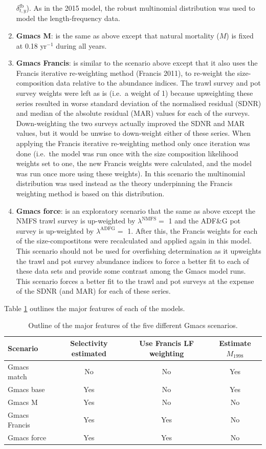 \documentclass[]{article}
\begin{document}
\begin{enumerate}
  \(\delta^\text{fb}_{t,y}\)). As in the 2015 model, the robust
  multinomial distribution was used to model the length-frequency data.
\item
  \textbf{Gmacs M}: is the same as above except that natural mortality
  (\(M\)) is fixed at 0.18 \(\text{yr}^{-1}\) during all years.
\item
  \textbf{Gmacs Francis}: is similar to the scenario above except that
  it also uses the Francis iterative re-weighting method (Francis 2011),
  to re-weight the size-composition data relative to the abundance
  indices. The trawl survey and pot survey weights were left as is
  (i.e.~a weight of 1) because upweighting these series resulted in
  worse standard deviation of the normalised residual (SDNR) and median
  of the absolute residual (MAR) values for each of the surveys.
  Down-weighting the two surveys actually improved the SDNR and MAR
  values, but it would be unwise to down-weight either of these series.
  When applying the Francis iterative re-weighting method only once
  iteration was done (i.e.~the model was run once with the size
  composition likelihood weights set to one, the new Francis weights
  were calculated, and the model was run once more using these weights).
  In this scenario the multinomial distribution was used instead as the
  theory underpinning the Francis weighting method is based on this
  distribution.
\item
  \textbf{Gmacs force}: is an exploratory scenario that the same as
  above except the NMFS trawl survey is up-weighted by
  \(\lambda^\text{NMFS}=\) 1 and the ADF\&G pot survey is up-weighted by
  \(\lambda^\text{ADFG}=\) 1. After this, the Francis weights for each
  of the size-compostitons were recalculated and applied again in this
  model. This scenario should not be used for overfishing determination
  as it upweights the trawl and pot survey abundance indices to force a
  better fit to each of these data sets and provide some contrast among
  the Gmacs model runs. This scenario forces a better fit to the trawl
  and pot surveys at the expense of the SDNR (and MAR) for each of these
  series.
\end{enumerate}

Table \ref{tab:model_runs} outlines the major features of each of the
models.

\begin{table}[ht]
\centering
\caption{Outline of the major features of the five different Gmacs scenarios.} 
\label{tab:model_runs}
\begin{tabular}{lccc}
  \hline
  Scenario & Selectivity estimated & Use Francis LF weighting & Estimate $M_{1998}$ \\
  \hline
  Gmacs match   & No  & No  & Yes \\ 
  Gmacs base    & Yes & No  & Yes \\ 
  Gmacs M       & Yes & No  & No  \\ 
  Gmacs Francis & Yes & Yes & No  \\ 
  Gmacs force   & Yes & Yes & No  \\ 
  \hline
\end{tabular}
\end{table}
\end{document}
